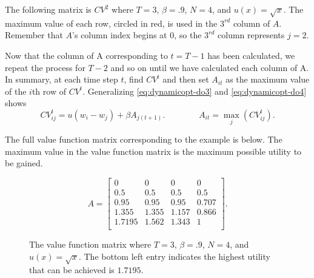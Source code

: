 The following matrix is $CV^{2}$ where $T=3$, $\beta = .9$, $N=4$, and $u(x) = \sqrt{x}$.
The maximum value of each row, circled in red, is used in the $3^{rd}$ column of $A$.
Remember that $A$'s column index begins at $0$, so the $3^{rd}$ column represents $j=2$.

\begin{center}
\end{center}

Now that the column of A corresponding to $t = T-1$ has been calculated, we repeat the process for $T-2$ and so on until we have calculated each column of A.
In summary, at each time step $t$, find $CV^t$ and then set $A_{it}$ as the maximum value of the $i$th row of $CV^t$.
Generalizing \eqref{eq:dynamicopt-do3} and \eqref{eq:dynamicopt-do4} shows
\begin{equation}\label{eq:dynamicopt-do5}
CV^{t}_{ij} = u(w_i - w_j) + \beta A_{j(t+1)}.
\qquad \qquad
A_{it} = \max_{j} \left(CV_{ij}^t \right).
\end{equation}

The full value function matrix corresponding to the example is below.
The maximum value in the value function matrix is the maximum possible utility to be gained.

\begin{figure}[H]
\[
A =
\begin{bmatrix}
0 & 0 & 0 & 0 \\
0.5 & 0.5 & 0.5 & 0.5 \\
0.95 & 0.95 & 0.95 & 0.707 \\
1.355 & 1.355 & 1.157 & 0.866 \\
1.7195 & 1.562 & 1.343 & 1 \\
\end{bmatrix}
.
\]
\caption{The value function matrix where $T=3$, $\beta=.9$, $N=4$, and $u(x) = \sqrt{x}$. The bottom left entry indicates the highest utility that can be achieved is $1.7195$.}
\label{fig:2nd_val_func_matrix}
\end{figure}

